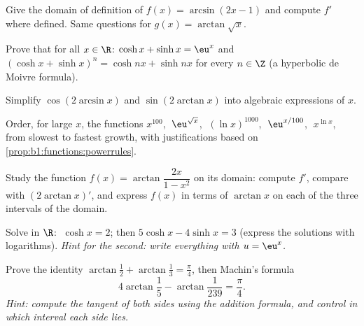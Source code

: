 \begin{exercise}[$\star$]\label{exo:b1:functions:2}
Give the domain of definition of $f(x) = \arcsin(2x - 1)$ and compute
$f'$ where defined. Same questions for $g(x) = \arctan\sqrt{x}$.
\end{exercise}

\begin{exercise}[$\star$]\label{exo:b1:functions:3}
Prove that for all $x \in \R$: $\cosh x + \sinh x = \eu^x$ and
$(\cosh x + \sinh x)^n = \cosh nx + \sinh nx$ for every $n \in \Z$
(a hyperbolic de Moivre formula).
\end{exercise}

\begin{exercise}[$\star$]\label{exo:b1:functions:4}
Simplify $\cos(2\arcsin x)$ and $\sin(2\arctan x)$ into algebraic
expressions of $x$.
\end{exercise}

\begin{exercise}[$\star$]\label{exo:b1:functions:5}
Order, for large $x$, the functions
$x^{100}$, $\;\eu^{\sqrt x}$, $\;(\ln x)^{1000}$, $\;\eu^{x/100}$,
$\;x^{\ln x}$, from slowest to fastest growth, with justifications
based on \cref{prop:b1:functions:powerrules}.
\end{exercise}

\begin{exercise}[$\star\star$]\label{exo:b1:functions:6}
Study the function $f(x) = \arctan\dfrac{2x}{1 - x^2}$ on its domain:
compute $f'$, compare with $(2\arctan x)'$, and express $f(x)$ in
terms of $\arctan x$ on each of the three intervals of the domain.
\end{exercise}

\begin{exercise}[$\star\star$]\label{exo:b1:functions:7}
Solve in $\R$: $\;\cosh x = 2$; then $5\cosh x - 4 \sinh x = 3$
(express the solutions with logarithms). \emph{Hint for the second:
write everything with $u = \eu^x$.}
\end{exercise}

\begin{exercise}[$\star\star$]\label{exo:b1:functions:8}
Prove the identity $\arctan\frac{1}{2} + \arctan\frac{1}{3} =
\frac{\pi}{4}$, then Machin's formula
\[
4\arctan\frac 15 - \arctan\frac{1}{239} = \frac{\pi}{4}.
\]
\emph{Hint: compute the tangent of both sides using the addition
formula, and control in which interval each side lies.}
\end{exercise}

